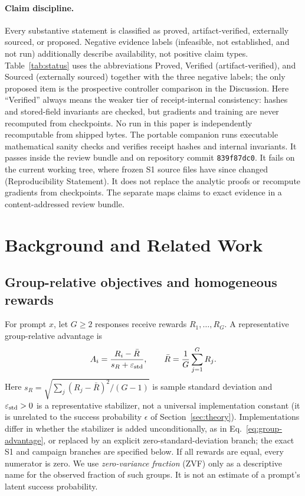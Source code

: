 \documentclass{article}
\begin{document}
\paragraph{Claim discipline.}
Every substantive statement is classified as proved,
artifact-verified, externally sourced, or proposed. Negative evidence labels
(infeasible, not established, and not run) additionally describe availability,
not positive claim types.  Table~\ref{tab:status} uses the abbreviations
Proved, Verified (artifact-verified), and Sourced (externally sourced) together
with the three negative labels; the only proposed item is the prospective
controller comparison in the Discussion.  Here ``Verified'' always means
the weaker tier of receipt-internal consistency: hashes and stored-field
invariants are checked, but gradients and training are never recomputed from
checkpoints.  No run in this paper is independently recomputable from
shipped bytes.  The portable companion
 runs executable mathematical sanity checks and verifies
receipt hashes and internal invariants.  It passes inside the review bundle
and on repository commit \texttt{839f87dc0}.  It fails on the current working
tree, where frozen S1 source files have since changed (Reproducibility
Statement).  It does not replace
the analytic proofs or recompute gradients from checkpoints.  The separate 
maps claims to exact evidence in a content-addressed review bundle.

\section{Background and Related Work}
\label{sec:background}

\subsection{Group-relative objectives and homogeneous rewards}

For prompt $x$, let $G\geq2$ responses receive rewards
$R_1,\ldots,R_G$.  A representative group-relative advantage is
\begin{equation}
  A_i = \frac{R_i-\bar R}{s_R+\varepsilon_{\rm std}},
  \qquad
  \bar R=\frac{1}{G}\sum_{j=1}^{G}R_j .
  \label{eq:group-advantage}
\end{equation}
Here $s_R=\sqrt{\sum_j(R_j-\bar R)^2/(G-1)}$ is sample standard
deviation and $\varepsilon_{\rm std}>0$ is a representative stabilizer, not a
universal implementation constant (it is unrelated to the success probability
$\epsilon$ of Section~\ref{sec:theory}).  Implementations differ in whether the
stabilizer is added unconditionally, as in Eq.~\eqref{eq:group-advantage}, or
replaced by an explicit zero-standard-deviation branch; the exact S1 and
campaign branches are specified below.
If all rewards are equal, every numerator is zero.  We use \emph{zero-variance
fraction} (ZVF) only as a descriptive name for the observed fraction of such
groups.  It is not an estimate of a prompt's latent success probability.
\end{document}
